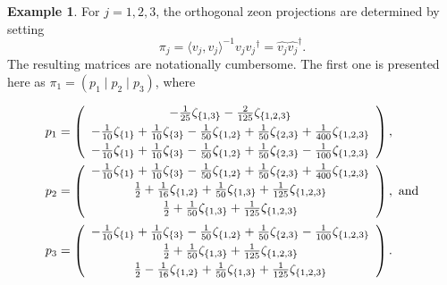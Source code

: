\documentclass{article}
\theoremstyle{definition}
\newtheorem{example}[theorem]{Example}
\numberwithin{equation}{section}
\begin{document}
\begin{example}
For $j=1,2,3$, the orthogonal zeon projections are determined by setting \begin{equation*}
\pi_j=\langle v_j,v_j\rangle^{-1} v_j{v_j}^\dag=\hat{v_j}\hat{v_j}^\dag.
\end{equation*}  
The resulting matrices are notationally cumbersome. The first one is presented here as  $\pi_1=(p_1\mid p_2\mid p_3)$, where 

\begin{align*}
p_1&=\left(
\begin{array}{c}
 -\frac{1}{25} \zeta _{\{1,3\}}-\frac{2}{125} \zeta _{\{1,2,3\}} \vspace{3pt}\\
 -\frac{1}{10}\zeta _{\{1\}}+\frac{1}{10}\zeta _{\{3\}}-\frac{1}{50} \zeta _{\{1,2\}}+\frac{1}{50} \zeta _{\{2,3\}}+\frac{1}{400} \zeta _{\{1,2,3\}} \vspace{3pt}\\
 -\frac{1}{10}\zeta _{\{1\}}+\frac{1}{10}\zeta _{\{3\}}-\frac{1}{50} \zeta _{\{1,2\}}+\frac{1}{50} \zeta _{\{2,3\}}-\frac{1}{100} \zeta _{\{1,2,3\}} 
\end{array}
\right),\\
p_2&=\left(
\begin{array}{c}
 -\frac{1}{10}\zeta _{\{1\}}+\frac{1}{10}\zeta _{\{3\}}-\frac{1}{50} \zeta _{\{1,2\}}+\frac{1}{50} \zeta _{\{2,3\}}+\frac{1}{400} \zeta _{\{1,2,3\}} \vspace{3pt}\\
 \frac{1}{2}+\frac{1}{16} \zeta _{\{1,2\}}+\frac{1}{50} \zeta _{\{1,3\}}+\frac{1}{125} \zeta _{\{1,2,3\}}\vspace{3pt} \\
 \frac{1}{2}+\frac{1}{50} \zeta _{\{1,3\}}+\frac{1}{125} \zeta _{\{1,2,3\}} \vspace{3pt}
\end{array}
\right),\text{ \rm and}\\
p_3&=\left(
\begin{array}{c}
-\frac{1}{10}\zeta _{\{1\}}+\frac{1}{10}\zeta _{\{3\}} -\frac{1}{50} \zeta _{\{1,2\}}+\frac{1}{50} \zeta _{\{2,3\}}-\frac{1}{100} \zeta _{\{1,2,3\}} \vspace{3pt}\\
 \frac{1}{2}+\frac{1}{50} \zeta _{\{1,3\}}+\frac{1}{125} \zeta _{\{1,2,3\}} \vspace{3pt}\\
\frac{1}{2}  -\frac{1}{16} \zeta _{\{1,2\}}+\frac{1}{50} \zeta _{\{1,3\}}+\frac{1}{125} \zeta _{\{1,2,3\}}
\end{array}
\right).
\end{align*}


\end{example}
\end{document}
